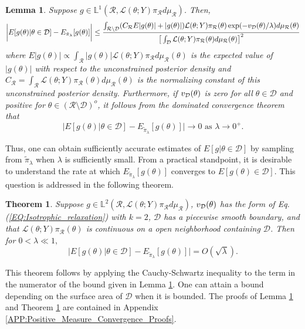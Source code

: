 \documentclass[10pt,fleqn]{article} \pdfoutput=1
\newtheorem{theorem}{Theorem} \newtheorem{lemma}{Lemma}
\DeclareMathOperator{\1}{\mathbbm{1}} \DeclareMathOperator{\bigO}{\mc O}
\begin{document}
\begin{lemma} \label{THM:positive_measure_approximation_error} Suppose $g
		\in \mathbb{L}^1(\mathcal{R},
		\mathcal{L}(\theta;Y)\pi_\mathcal{R}d\mu_\mathcal{R})$.  Then,
	$$\bigg|E[g(\theta) |\theta\in\mathcal{D}] -
		E_{\tilde{\pi}_\lambda}[g(\theta)]   \bigg| \le
		\frac{\int_{\mathcal{R}\setminus \mathcal{D}}
		(C_\mathcal{R}E|g(\theta)|+|g(\theta)|) \mathcal{L}(\theta; Y)
		\pi_\mathcal{R}(\theta)\exp(-v_{\mathcal{D}}(\theta)/\lambda )
		d\mu_\mathcal{R}(\theta)}{\big[\int_\mathcal{D} \mathcal{L}(\theta; Y)
				\pi_\mathcal{R}(\theta)d\mu_\mathcal{R}(\theta)\big]^2 }$$ where
	$E|g(\theta)| \propto \int_\mathcal{R} |g(\theta)|
		\mathcal{L}(\theta;Y)\pi_\mathcal{R} d\mu_\mathcal{R}(\theta)$ is the
	expected value of $|g(\theta)|$ with respect to the unconstrained posterior
	density and $C_\mathcal{R} = \int_\mathcal{R}
		\mathcal{L}(\theta;Y)\pi_\mathcal{R}(\theta)d\mu_\mathcal{R}(\theta)$ is
	the normalizing constant of this unconstrained posterior density.
	Furthermore, if $v_{\mathcal{D}}(\theta)$ is zero for all $\theta\in\mathcal{D}$ and
	positive for $\theta\in(\mathcal{R}\setminus\mathcal{D})^o$, it follows
	from the dominated convergence theorem that $$\bigg|E[g(\theta)
		|\theta\in\mathcal{D}] - E_{\tilde{\pi}_\lambda}[g(\theta)]   \bigg|\to 0
		\text{ as } \lambda \to 0^+.$$ \end{lemma}

Thus, one can obtain sufficiently accurate estimates of
$E[g|\theta\in\mathcal{D}]$ by sampling from $\tilde{\pi}_\lambda$ when
$\lambda$ is sufficiently small.  From a practical standpoint, it is
desirable to understand the rate at which
$E_{\tilde{\pi}_\lambda}[g(\theta)] $ converges to
$E[g(\theta)\in\mathcal{D}]$. This question is addressed in the following
theorem.

\begin{theorem} \label{THM:Positive_measure_convergence_rate} Suppose $g
		\in  \mathbb{L}^2(\mathcal{R},
		\mathcal{L}(\theta;Y)\pi_\mathcal{R}d\mu_\mathcal{R})$,
	$v_{\mathcal{D}}(\theta)$ has the form of Eq. (\ref{EQ:Isotrophic_relaxation})
	with $k=2$, $\mathcal{D}$ has a piecewise smooth boundary, and that
	$\mathcal{L}(\theta;Y)\pi_\mathcal{R}(\theta)$ is continuous on a
	open neighborhood containing $\mathcal{D}$.  Then for $0<\lambda
		\ll 1,$ $$ \bigg|E[g(\theta) |\theta\in\mathcal{D}] -
		E_{\tilde{\pi}_\lambda}[g(\theta)]   \bigg| = O(\sqrt{\lambda}).  $$
\end{theorem} This theorem follows by applying the Cauchy-Schwartz
inequality to the term in the numerator of the bound given in Lemma
\ref{THM:positive_measure_approximation_error}.  One can attain a bound
depending on the surface area of $\mathcal{D}$ when it is bounded. The proofs of
Lemma \ref{THM:positive_measure_approximation_error} and Theorem
\ref{THM:Positive_measure_convergence_rate} are contained in Appendix
\ref{APP:Positive_Measure_Convergence_Proofs}.
\end{document}
